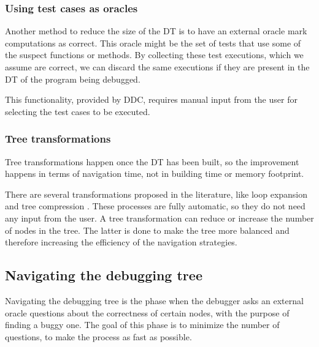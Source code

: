 \subsubsection{Using test cases as oracles}

Another method to reduce the size of the DT is to have an external oracle mark computations as correct.
This oracle might be the set of tests that use some of the suspect functions or methods. By collecting these test executions, which we assume are correct, we can discard the same executions if they are present in the DT of the program being debugged.

This functionality, provided by DDC, requires manual input from the user for selecting the test cases to be executed.


\subsubsection{Tree transformations}
Tree transformations happen once the DT has been built, so the improvement happens in terms of navigation time, not in building time or memory footprint.

There are several transformations proposed in the literature, like loop expansion and tree compression \cite{LoopExpansionTreeCompression}.
These processes are fully automatic, so they do not need any input from the user. A tree transformation can reduce or increase the number of nodes in the tree. The latter is done to make the tree more balanced and therefore increasing the efficiency of the navigation strategies.

\subsection{Navigating the debugging tree}
Navigating the debugging tree is the phase when the debugger asks an external oracle questions about the correctness of certain nodes, with the purpose of finding a buggy one.
The goal of this phase is to minimize the number of questions, to make the process as fast as possible.

